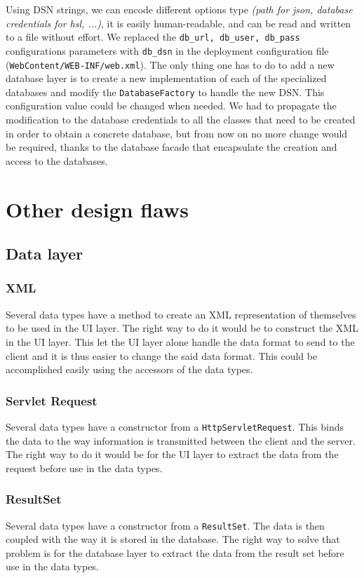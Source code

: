 Using DSN strings, we can encode different options type \textit{(path for json, database credentials for hsl, ...)}, it is easily human-readable, and can be read and written to a file without effort. We replaced the \texttt{db\_url, db\_user, db\_pass} configurations parameters with \texttt{db\_dsn} in the deployment configuration file (\texttt{WebContent/WEB-INF/web.xml}). The only thing one has to do to add a new database layer is to create a new implementation of each of the specialized databases and modify the \texttt{DatabaseFactory} to handle the new DSN. This configuration value could be changed when needed. We had to propagate the modification to the database credentials to all the classes that need to be created in order to obtain a concrete database, but from now on no more change would be required, thanks to the database facade that encapsulate the creation and access to the databases.


\section{Other design flaws}

\subsection{Data layer}

\subsubsection{XML}
Several data types have a method to create an XML representation of themselves to be used in the UI layer. The right way to do it would be to construct the XML in the UI layer. This let the UI layer alone handle the data format to send to the client and it is thus easier to change the said data format. This could be accomplished easily using the accessors of the data types.

\subsubsection{Servlet Request}
Several data types have a constructor from a \texttt{HttpServletRequest}. This binds the data to the way information is transmitted between the client and the server. The right way to do it would be for the UI layer to extract the data from the request before use in the data types.

\subsubsection{ResultSet}
Several data types have a constructor from a \texttt{ResultSet}. The data is then coupled with the way it is stored in the database. The right way to solve that problem is for the database layer to extract the data from the result set before use in the data types.

